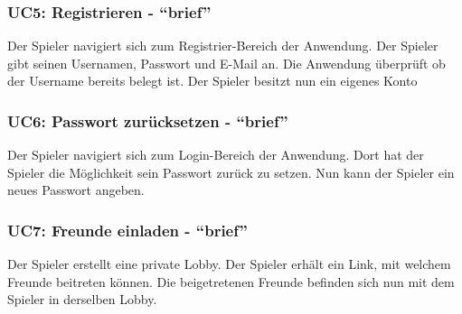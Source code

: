 \documentclass[11pt,ngerman]{article}
\newcommand{\quotes}[1]{``#1''}
\begin{document}
             \subsubsection{UC5: Registrieren - \quotes{brief}}
             \label{sssec:UC5Registrieren}
                 \begin{tcolorbox}[enhanced, breakable, sharp corners, width=\dimexpr\textwidth-15mm\relax ,enlarge left by=10mm ,fontupper=\linespread{1.1}\selectfont, boxrule=1pt, title={UC5: Registrieren}, colback=white, colframe=gray!22, coltitle=black]
                     Der Spieler navigiert sich zum Registrier-Bereich der Anwendung. Der Spieler gibt seinen Usernamen, Passwort und E-Mail an.\newline
                     Die Anwendung überprüft ob der Username bereits belegt ist. Der Spieler besitzt nun ein eigenes Konto
                 \end{tcolorbox}

             \subsubsection{UC6: Passwort zurücksetzen - \quotes{brief}}
             \label{sssec:UC6Passwortsetzen}
                \begin{tcolorbox}[enhanced, breakable, sharp corners, width=\dimexpr\textwidth-15mm\relax ,enlarge left by=10mm ,fontupper=\linespread{1.1}\selectfont, boxrule=1pt, title={UC6: Passwort zurücksetzen}, colback=white, colframe=gray!22, coltitle=black]
                    Der Spieler navigiert sich zum Login-Bereich der Anwendung. Dort hat der Spieler die Möglichkeit sein Passwort zurück zu setzen.\newline
                    Nun kann der Spieler ein neues Passwort angeben.
                \end{tcolorbox}

             \subsubsection{UC7: Freunde einladen - \quotes{brief}}
             \label{sssec:UC7Freundeeinladen}
                \begin{tcolorbox}[enhanced, breakable, sharp corners, width=\dimexpr\textwidth-15mm\relax ,enlarge left by=10mm ,fontupper=\linespread{1.1}\selectfont, boxrule=1pt, title={UC7: Freunde einladen}, colback=white, colframe=gray!22, coltitle=black]
                    Der Spieler erstellt eine private Lobby. Der Spieler erhält ein Link, mit welchem Freunde beitreten können.\newline
                    Die beigetretenen Freunde befinden sich nun mit dem Spieler in derselben Lobby.
                \end{tcolorbox}
\end{document}
